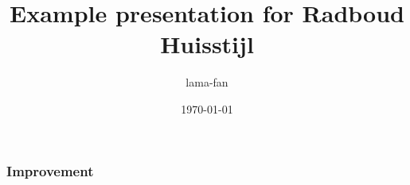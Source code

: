 \documentclass{beamer}
\title{Example presentation for Radboud Huisstijl}
\date{\today}
\author{lama-fan}
\begin{document}
\begin{frame}
    \titlepage
\end{frame}

\begin{frame}
    \frametitle{Improvement}
    
\end{frame}
\end{document}
